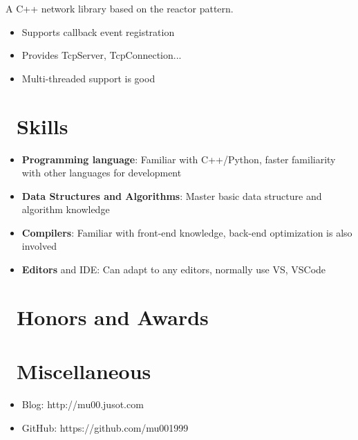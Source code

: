 \documentclass{resume}
\begin{document}
A C++ network library based on the reactor pattern.
\begin{onehalfspacing}
\begin{itemize}
  \item Supports callback event registration
  \item Provides TcpServer, TcpConnection...
  \item Multi-threaded support is good
\end{itemize}
\end{onehalfspacing}


\section{\faCogs\ Skills}
\begin{itemize}[parsep=0.5ex]
  \item \textbf{Programming language}: Familiar with C++/Python, faster familiarity with other languages for development
  \item \textbf{Data Structures and Algorithms}: Master basic data structure and algorithm knowledge
  \item \textbf{Compilers}: Familiar with front-end knowledge, back-end optimization is also involved
  \item \textbf{Editors} and IDE: Can adapt to any editors, normally use VS, VSCode
\end{itemize}

\section{\faHeartO\ Honors and Awards}

\section{\faInfo\ Miscellaneous}
\begin{itemize}[parsep=0.5ex]
  \item Blog: http://mu00.jusot.com
  \item GitHub: https://github.com/mu001999
\end{itemize}

%
%
\end{document}
